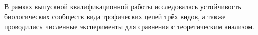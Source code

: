 \begin{center}
    \section*{}
\end{center}
\thispagestyle{empty}

В рамках выпускной квалификационной работы исследовалась устойчивость биологических сообществ вида трофических цепей трёх видов, а также проводились численные эксперименты для сравнения с теоретическим анализом.